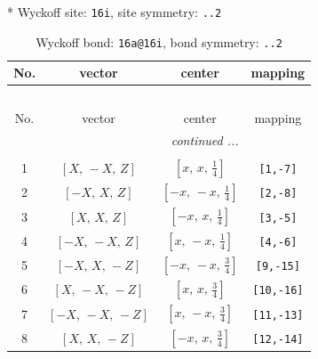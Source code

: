 \documentclass[fleqn,8pt]{jsarticle}
\begin{document}
* Wyckoff site: {\tt 16i}, site symmetry: {\tt ..2}
\renewcommand{\arraystretch}{1.2}
\begin{longtable}{cccc}
\caption{Wyckoff bond: {\tt 16a@16i}, bond symmetry: {\tt ..2}}
 \\
 \hline \hline
No. & vector & center & mapping \\ \hline \endfirsthead

\multicolumn{3}{l}{\tablename\ \thetable{}} \\
 \hline \hline
No. & vector & center & mapping \\ \hline \endhead

 \hline \hline
\multicolumn{3}{r}{\footnotesize\it continued ...} \\ \endfoot

 \hline \hline
\multicolumn{3}{r}{} \\ \endlastfoot

1 & $\left[ X,\, - X,\, Z \right]$ & $\left[ x,\, x,\, \frac{1}{4} \right]$ & {\tt [1,-7]} \\ \hline
2 & $\left[ - X,\, X,\, Z \right]$ & $\left[ - x,\, - x,\, \frac{1}{4} \right]$ & {\tt [2,-8]} \\ \hline
3 & $\left[ X,\, X,\, Z \right]$ & $\left[ - x,\, x,\, \frac{1}{4} \right]$ & {\tt [3,-5]} \\ \hline
4 & $\left[ - X,\, - X,\, Z \right]$ & $\left[ x,\, - x,\, \frac{1}{4} \right]$ & {\tt [4,-6]} \\ \hline
5 & $\left[ - X,\, X,\, - Z \right]$ & $\left[ - x,\, - x,\, \frac{3}{4} \right]$ & {\tt [9,-15]} \\ \hline
6 & $\left[ X,\, - X,\, - Z \right]$ & $\left[ x,\, x,\, \frac{3}{4} \right]$ & {\tt [10,-16]} \\ \hline
7 & $\left[ - X,\, - X,\, - Z \right]$ & $\left[ x,\, - x,\, \frac{3}{4} \right]$ & {\tt [11,-13]} \\ \hline
8 & $\left[ X,\, X,\, - Z \right]$ & $\left[ - x,\, x,\, \frac{3}{4} \right]$ & {\tt [12,-14]} \\
\end{longtable}
\renewcommand{\arraystretch}{1.2}
\end{document}
